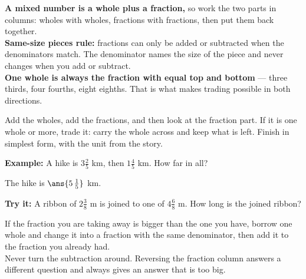 \documentclass[12pt]{article}
\begin{document}

\begin{formulabox}
\textbf{A mixed number is a whole plus a fraction,} so work the two parts in
columns: wholes with wholes, fractions with fractions, then put them back
together.\\[3pt]
\textbf{Same-size pieces rule:} fractions can only be added or subtracted when
the denominators match. The denominator names the size of the piece and never
changes when you add or subtract.\\[3pt]
\textbf{One whole is always the fraction with equal top and bottom} --- three
thirds, four fourths, eight eighths. That is what makes trading possible in
both directions.
\end{formulabox}


\begin{formulabox}
Add the wholes, add the fractions, and then look at the fraction part. If it is
one whole or more, trade it: carry the whole across and keep what is left.
Finish in simplest form, with the unit from the story.
\end{formulabox}

\begin{examplebox}
\textbf{Example:} A hike is $3\tfrac{2}{5}$ km, then $1\tfrac{4}{5}$ km. How
far in all?

The hike is $\ans{5\,\tfrac{1}{5}}$ km.
\end{examplebox}

\begin{tryitbox}
\textbf{Try it:} A ribbon of $2\tfrac{3}{8}$ m is joined to one of
$4\tfrac{6}{8}$ m. How long is the joined ribbon?\\[2pt]
\end{tryitbox}


\begin{formulabox}
If the fraction you are taking away is bigger than the one you have, borrow one
whole and change it into a fraction with the same denominator, then add it to
the fraction you already had.\\[3pt]
Never turn the subtraction around. Reversing the fraction column answers a
different question and always gives an answer that is too big.
\end{formulabox}
\end{document}
